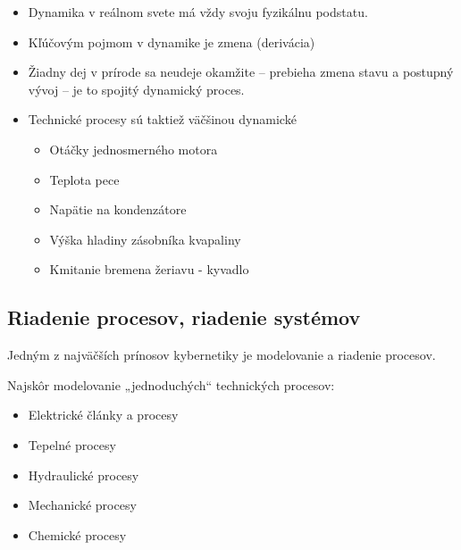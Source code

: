 \documentclass[a4paper, 10pt, ]{article}
\begin{document}
\begin{itemize}[leftmargin=0pt, labelsep=3mm, itemsep=0pt]
    \item Dynamika v reálnom svete má vždy svoju fyzikálnu podstatu.
    \item Kľúčovým pojmom v dynamike je zmena (derivácia)
    \item Žiadny dej v prírode sa neudeje okamžite – prebieha zmena stavu a postupný vývoj – je to spojitý dynamický proces.
    \item Technické procesy sú taktiež väčšinou dynamické
    \begin{itemize}
        \item Otáčky jednosmerného motora
        \item Teplota pece
        \item Napätie na kondenzátore
        \item Výška hladiny zásobníka kvapaliny
        \item Kmitanie bremena žeriavu - kyvadlo
    \end{itemize}
\end{itemize}






\pagebreak

\begin{centering}


    \vspace{-8mm}


\end{centering}

\pagebreak



\subsection{Riadenie procesov, riadenie systémov}

Jedným z najväčších prínosov kybernetiky je modelovanie a riadenie procesov.

Najskôr modelovanie „jednoduchých“ technických procesov:
\begin{itemize}
    \item Elektrické články a procesy
    \item Tepelné procesy
    \item Hydraulické procesy
    \item Mechanické procesy
    \item Chemické procesy
\end{itemize}
\end{document}
